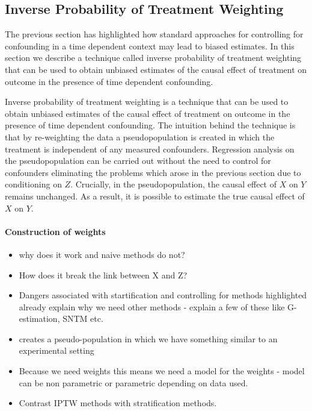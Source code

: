 \documentclass[11pt]{article}
\providecommand{\tightlist}{%
      \setlength{\itemsep}{0pt}\setlength{\parskip}{0pt}}
\begin{document}
    \subsection{Inverse Probability of Treatment
Weighting}\label{inverse-probability-of-treatment-weighting}

The previous section has highlighted how standard approaches for
controlling for confounding in a time dependent context may lead to
biased estimates. In this section we describe a technique called inverse
probability of treatment weighting that can be used to obtain unbiased
estimates of the causal effect of treatment on outcome in the presence
of time dependent confounding.

Inverse probability of treatment weighting is a technique that can be
used to obtain unbiased estimates of the causal effect of treatment on
outcome in the presence of time dependent confounding. The intuition
behind the technique is that by re-weighting the data a pseudopopulation
is created in which the treatment is independent of any measured
confounders. Regression analysis on the pseudopopulation can be carried
out without the need to control for confounders eliminating the problems
which arose in the previous section due to conditioning on \(Z\).
Crucially, in the pseudopopulation, the causal effect of \(X\) on \(Y\)
remains unchanged. As a result, it is possible to estimate the true
causal effect of \(X\) on \(Y\).

\paragraph{Construction of weights}\label{construction-of-weights}

\begin{itemize}
\tightlist
\item
  why does it work and naive methods do not?
\item
  How does it break the link between X and Z?
\item
  Dangers associated with startification and controlling for methods
  highlighted already explain why we need other methods - explain a few
  of these like G-estimation, SNTM etc.
\item
  creates a pseudo-population in which we have something similar to an
  experimental setting
\item
  Because we need weights this means we need a model for the weights -
  model can be non parametric or parametric depending on data used.
\item
  Contrast IPTW methods with stratification methods.
\end{itemize}
\end{document}
